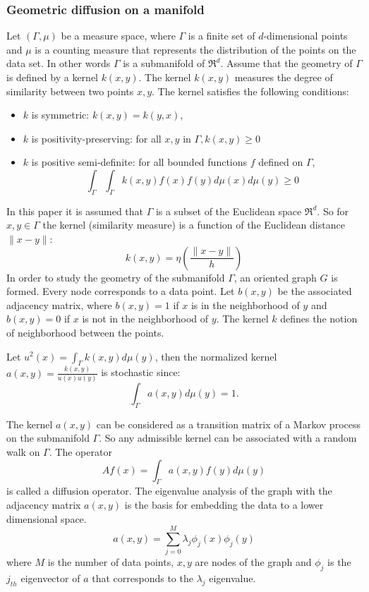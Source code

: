 \documentclass[12pt,letterpaper,doublespaced,ETD,dvips,proposal]{gtthesis}
\begin{document}
\begin{Body}
\subsubsection{Geometric diffusion on a manifold} 
Let  $(\Gamma,\mu)$
be a measure space, where $\Gamma$ is a finite set of
$d$-dimensional points and $\mu$ is a counting measure that
represents the distribution of the points on the  data set. In other
words $\Gamma$ is a submanifold of $\Re^{d}$. Assume that the
geometry of $\Gamma$ is defined by a kernel $k(x,y)$. The kernel
$k(x,y)$ measures the degree of similarity between two points $x,y$.
The kernel satisfies the following conditions:
\begin{itemize}
    \item   $k$ is symmetric: $k(x,y)=k(y,x)$,
    \item   $k$ is positivity-preserving: for all $x,y$ in
$\Gamma, k(x,y)\geq 0$
    \item   $k$ is positive semi-definite: for all bounded
functions $f$ defined on  $\Gamma$,
\[
\int_{\Gamma} \int_{\Gamma} k(x,y)f(x)f(y)d\mu(x)d\mu(y)\geq 0\]
\end{itemize}
In this paper it is assumed that $\Gamma$ is a subset of the
Euclidean space $\Re^{d}$. So for $x,y\in\Gamma$ the kernel
(similarity measure) is a function of the Euclidean distance
$\parallel x-y\parallel:$
\[
 k(x,y)=\eta\left(\frac{\parallel x-y\parallel}{h}\right)
\]
In order to study the geometry of the submanifold $\Gamma$, an
oriented graph $G$ is formed. Every node corresponds to a data
point. Let $b(x,y)$ be the associated adjacency matrix, where
$b(x,y)=1$ if $x$ is in the neighborhood of $y$ and $b(x,y)=0$ if
$x$ is not in the neighborhood of $y$. The kernel $k$ defines the
notion of neighborhood between the points.

Let $u^2(x)=\int_{\Gamma}k(x,y)d\mu(y)$, then the normalized kernel
$a(x,y)=\frac{k(x,y)}{u(x)u(y)}$ is stochastic since:
\begin{equation}\label{kernel}
    \int_{\Gamma}a(x,y)d\mu(y)=1.
\end{equation}

The kernel $a(x,y)$ can be considered as a transition matrix of a
Markov process on the submanifold $\Gamma$. So any admissible kernel
can be associated with a random walk on $\Gamma$. The operator
\[
    Af(x)=\int_{\Gamma}a(x,y)f(y)d\mu(y)
\]
is called a diffusion operator. The eigenvalue analysis of the graph
with the adjacency matrix $a(x,y)$ is the basis for embedding the
data to a lower dimensional space.
\[
    a(x,y)=\sum_{j=0}^{M} \lambda_{j}\phi_{j}(x)\phi_{j}(y)
\]
where $M$ is the number of data points, $x,y$ are nodes of the graph
and $\phi_j$ is the $j_{th}$ eigenvector of $a$ that corresponds to
the $\lambda_j$ eigenvalue.



\end{Body}
\end{document}

